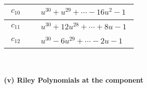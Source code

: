 \documentclass[1p]{elsarticle_modified}
\theoremstyle{definition}
\begin{document}
\begin{tabular}{m{50pt}|m{274pt}}
\hline $$\begin{aligned}c_{10}\end{aligned}$$&$\begin{aligned}
&u^{30}+u^{29}+\cdots-16 u^2-1
\end{aligned}$\\
\hline $$\begin{aligned}c_{11}\end{aligned}$$&$\begin{aligned}
&u^{30}+12 u^{28}+\cdots+8 u-1
\end{aligned}$\\
\hline $$\begin{aligned}c_{12}\end{aligned}$$&$\begin{aligned}
&u^{30}-6 u^{29}+\cdots-2 u-1
\end{aligned}$\\
\hline
\end{tabular}\\~\\
\newpage\renewcommand{\arraystretch}{1}
\flushleft \textbf{(v) Riley Polynomials at the component}\newline \\
\end{document}
